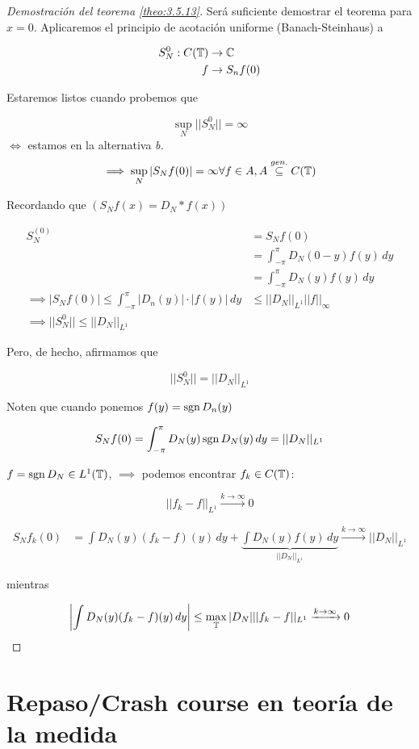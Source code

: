 \begin{proof}[Demostración del teorema \ref{theo:3.5.13}]
    Será suficiente demostrar el teorema para $x=0$. Aplicaremos el principio de acotación uniforme (Banach-Steinhaus) a 

    \begin{align*}
        S_N^0:C(\mathbb{T})&\to\mathbb{C}\\
        f&\to S_n f(0)
    \end{align*}

    Estaremos listos cuando probemos que 

    \[\sup_N ||S_N^0||=\infty\]
    $\iff$ estamos en la alternativa \emph{b.}
    \[\implies \sup_N |S_N f(0)|=\infty\forall f\in A, A\overset{gen.}{\subseteq} C(\mathbb{T})\]

    Recordando que $(S_N f(x)=D_N*f(x))$

    \begin{align*}
        S_N^{(0)}&=S_N f(0)\\
        &=\int_{-\pi}^\pi D_N(0-y)f(y)\,dy\\
        &=\int_{-\pi}^\pi D_N(y)f(y)\,dy\\
        \implies |S_N f(0)|\leq \int_{-\pi}^\pi |D_n(y)|\cdot|f(y)|\,dy&\leq ||D_N||_{L^1}||f||_{\infty}\\
        \implies ||S_N^0||\leq ||D_N||_{L^1}
    \end{align*}

    Pero, de hecho, afirmamos que 

    \[||S_N^0||=||D_N||_{L^1}\]

    Noten que cuando ponemos $f(y)=\operatorname{sgn} D_n(y)$

    \[S_N f(0)=\int_{-\pi}^\pi D_N(y)\operatorname{sgn} D_N(y)\,dy=||D_N||_{L^1}\]

    $f=\operatorname{sgn} D_N\in L^1(\mathbb{T})$, $\implies$ podemos encontrar $f_k\in C(\mathbb{T})$:

    \[||f_k-f||_{L^1}\xrightarrow{k\to\infty}0\]

    \begin{align*}
        S_N f_k(0)&=\int D_N(y)(f_k-f)(y)\,dy+\underbrace{\int D_N(y)f(y)\,dy}_{||D_N||_{L^1}}\xrightarrow{k\to\infty} ||D_N||_{L^1}
    \end{align*}

    mientras 

    \[\left|\int D_N(y)(f_k-f)(y)\,dy\right|\leq \max_{\mathbb{T}} |D_N|||f_k-f||_{L^1}\xrightarrow{k\to\infty}0\]
\end{proof}

\section{Repaso/Crash course en teoría de la medida}

